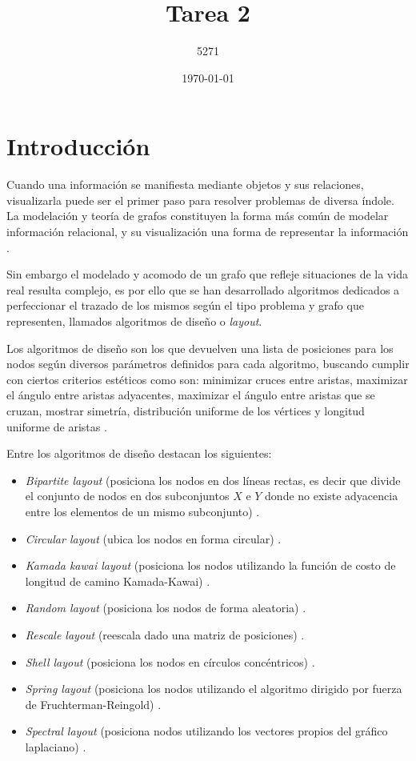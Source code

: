 \documentclass{article}
\title{Tarea 2}
\author{5271}
\date{\today}
\begin{document}
\maketitle
\section{Introducción}
Cuando una información se manifiesta mediante objetos y sus relaciones, visualizarla puede ser el primer paso para resolver problemas de diversa índole. 
La modelación y teoría de grafos constituyen la forma más común de modelar información relacional, y su visualización una forma de representar la información \cite {tesis}.

Sin embargo el modelado y acomodo de un grafo que refleje situaciones de la vida real resulta complejo, es por ello que se han desarrollado algoritmos dedicados a perfeccionar el trazado de los mismos según el tipo problema y grafo que representen, llamados algoritmos de diseño o \textit{layout}.

Los algoritmos de diseño son los que devuelven una lista de posiciones para los nodos según diversos parámetros definidos para cada algoritmo, buscando cumplir con ciertos criterios estéticos como son: minimizar cruces entre aristas, maximizar el ángulo entre aristas adyacentes, maximizar el ángulo entre aristas que se cruzan, mostrar simetría, distribución uniforme de los vértices y longitud uniforme de aristas \cite {tesis}.

Entre los algoritmos de diseño destacan los siguientes:

\begin{itemize}
 \item\textit{Bipartite layout} (posiciona los nodos en dos líneas rectas, es decir que divide el conjunto de nodos en dos subconjuntos $ X $ e $ Y $ donde no existe adyacencia entre los elementos de un mismo subconjunto)  \cite{networkx}.  
 \item\textit{Circular layout} (ubica los nodos en forma circular) \cite{networkx}.
	\item\textit{Kamada kawai layout} (posiciona los nodos utilizando la función de costo de longitud de camino Kamada-Kawai) \cite{networkx}.
	\item\textit{Random layout} (posiciona los nodos de forma aleatoria) \cite{networkx}.
	\item\textit{Rescale layout} (reescala dado una matriz de posiciones) \cite{networkx}.
	\item\textit{Shell layout} (posiciona los nodos en círculos concéntricos) \cite{networkx}.
	\item\textit{Spring layout} (posiciona los nodos utilizando el algoritmo dirigido por fuerza de Fruchterman-Reingold) \cite{networkx}.
	\item\textit{Spectral layout} (posiciona nodos utilizando los vectores propios del gráfico laplaciano) \cite{networkx}.
\end{itemize}
\end{document}
